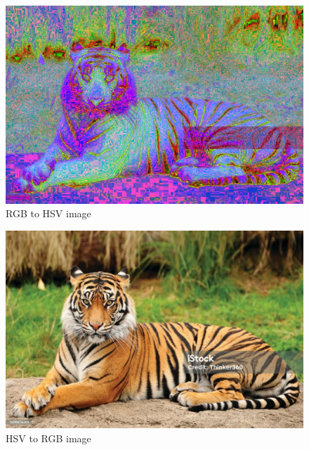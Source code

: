 \documentclass{article}
\begin{document}
\begin{figure}[h]
\begin{center}
   \includegraphics[scale=0.5]{rgb_to_hsv.png}
\end{center}
\caption{RGB to HSV image}
\end{figure}

\begin{figure}[h]
\begin{center}
   \includegraphics[scale=0.5]{hsv_to_rgb.png}
\end{center}
\caption{HSV to RGB image}
\end{figure}
\end{document}
